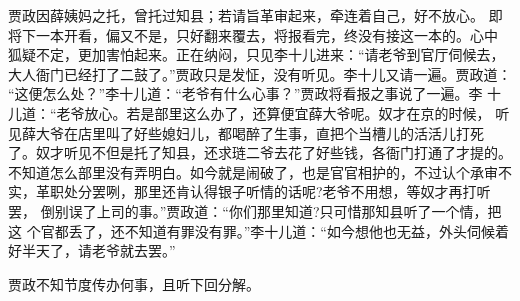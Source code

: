 贾政因薛姨妈之托，曾托过知县；若请旨革审起来，牵连着自己，好不放心。
即将下一本开看，偏又不是，只好翻来覆去，将报看完，终没有接这一本的。心中
狐疑不定，更加害怕起来。正在纳闷，只见李十儿进来：“请老爷到官厅伺候去，
大人衙门已经打了二鼓了。”贾政只是发怔，没有听见。李十儿又请一遍。贾政道：
“这便怎么处？”李十儿道：“老爷有什么心事？”贾政将看报之事说了一遍。李
十儿道：“老爷放心。若是部里这么办了，还算便宜薛大爷呢。奴才在京的时候，
听见薛大爷在店里叫了好些媳妇儿，都喝醉了生事，直把个当槽儿的活活儿打死
了。奴才听见不但是托了知县，还求琏二爷去花了好些钱，各衙门打通了才提的。
不知道怎么部里没有弄明白。如今就是闹破了，也是官官相护的，不过认个承审不
实，革职处分罢咧，那里还肯认得银子听情的话呢?老爷不用想，等奴才再打听罢，
倒别误了上司的事。”贾政道：“你们那里知道?只可惜那知县听了一个情，把这
个官都丢了，还不知道有罪没有罪。”李十儿道：“如今想他也无益，外头伺候着
好半天了，请老爷就去罢。”

贾政不知节度传办何事，且听下回分解。